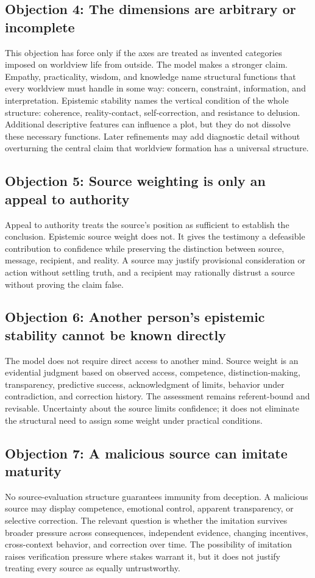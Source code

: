 \documentclass[11pt]{article}
\begin{document}
\subsection{Objection 4: The dimensions are arbitrary or incomplete}
This objection has force only if the axes are treated as invented categories imposed on worldview life from outside. The model makes a stronger claim. Empathy, practicality, wisdom, and knowledge name structural functions that every worldview must handle in some way: concern, constraint, information, and interpretation. Epistemic stability names the vertical condition of the whole structure: coherence, reality-contact, self-correction, and resistance to delusion. Additional descriptive features can influence a plot, but they do not dissolve these necessary functions. Later refinements may add diagnostic detail without overturning the central claim that worldview formation has a universal structure.

\subsection{Objection 5: Source weighting is only an appeal to authority}
Appeal to authority treats the source's position as sufficient to establish the conclusion. Epistemic source weight does not. It gives the testimony a defeasible contribution to confidence while preserving the distinction between source, message, recipient, and reality. A source may justify provisional consideration or action without settling truth, and a recipient may rationally distrust a source without proving the claim false.

\subsection{Objection 6: Another person's epistemic stability cannot be known directly}
The model does not require direct access to another mind. Source weight is an evidential judgment based on observed access, competence, distinction-making, transparency, predictive success, acknowledgment of limits, behavior under contradiction, and correction history. The assessment remains referent-bound and revisable. Uncertainty about the source limits confidence; it does not eliminate the structural need to assign some weight under practical conditions.

\subsection{Objection 7: A malicious source can imitate maturity}
No source-evaluation structure guarantees immunity from deception. A malicious source may display competence, emotional control, apparent transparency, or selective correction. The relevant question is whether the imitation survives broader pressure across consequences, independent evidence, changing incentives, cross-context behavior, and correction over time. The possibility of imitation raises verification pressure where stakes warrant it, but it does not justify treating every source as equally untrustworthy.
\end{document}

